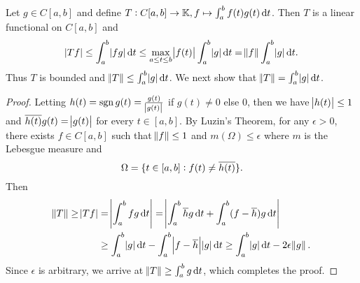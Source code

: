 \begin{example}
\label{ex:bounded_linear_operators:integral_functional}
Let $g \in C[a, b]$ and define $T: C[a, b] \to \mathbb{K}, f \mapsto 
\int_{a}^{b} f(t)g(t) \mathop{}\!\mathrm{d} t$. 
Then $T$ is a linear functional on $C[a, b]$ and 
\begin{equation*}
    \abs{Tf} \le \int_{a}^{b} \abs{f g} \mathop{}\!\mathrm{d} t 
    \le \max_{a \le t \le b} \abs{f(t)} \int_{a}^{b} \abs{g} \mathop{}\!\mathrm{d} t 
    = \norm{f} \int_{a}^{b} \abs{g} \mathop{}\!\mathrm{d} t. 
\end{equation*}
Thus $T$ is bounded and $\norm{T} \le \int_{a}^{b} \abs{g} \mathop{}\!\mathrm{d} t$. 
We next show that $\norm{T} = \int_{a}^{b} \abs{g} \mathop{}\!\mathrm{d} t$. 
\begin{proof}
Letting $h(t) = \operatorname{sgn} g(t) = \frac{g(t)}{\abs{g(t)}}$ if $g(t) \neq 0$ 
else $0$, then we have $\abs{h(t)} \le 1$ and $\overline{h(t)} g(t) = 
\abs{g(t)}$ for every $t \in [a, b]$. 
By Luzin's Theorem, for any $\epsilon > 0$, there exists $f \in C[a, b]$ 
such that $\norm{f} \le 1$ and $m(\Omega) \le \epsilon$ where $m$ is the 
Lebesgue measure and 
\begin{equation*}
    \Omega = \{t \in [a, b] : f(t) \neq \overline{h(t)} \}.
\end{equation*}
Then 
\begin{equation*}
    \begin{aligned}
        \norm{T} \ge \abs{Tf} &= \abs{\int_{a}^{b} f g \mathop{}\!\mathrm{d} t} 
        = \abs{\int_{a}^{b} \overline{h} g \mathop{}\!\mathrm{d} t 
            + \int_{a}^{b} (f - \overline{h})g \mathop{}\!\mathrm{d} t} \\
        &\ge \int_{a}^{b} \abs{g} \mathop{}\!\mathrm{d} t 
            - \int_{a}^{b} \abs{f - \overline{h}} \abs{g} \mathop{}\!\mathrm{d} t 
        \ge \int_{a}^{b} \abs{g} \mathop{}\!\mathrm{d} t - 2 \epsilon \norm{g}. 
    \end{aligned}
\end{equation*}
Since $\epsilon$ is arbitrary, we arrive at $\norm{T} \ge
\int_{a}^{b} g \mathop{}\!\mathrm{d} t$, which completes the proof.
\end{proof}
\end{example}

